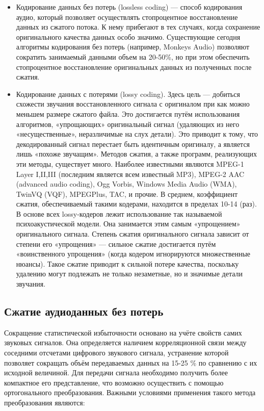 \documentclass[a4paper]{report}
\begin{document}
\begin{itemize}
\begin{itemize}
\item Кодирование данных без потерь (lossless coding) — способ кодирования аудио, который позволяет осуществлять стопроцентное восстановление данных из сжатого потока. К нему прибегают в тех случаях, когда сохранение оригинального качества данных особо значимо. Существующие сегодня алгоритмы кодирования без потерь (например, Monkeys Audio) позволяют сократить занимаемый данными объем на 20-50\%, но при этом обеспечить стопроцентное восстановление оригинальных данных из полученных после сжатия.
\item Кодирование данных с потерями (lossy coding). Здесь цель — добиться схожести звучания восстановленного сигнала с оригиналом при как можно меньшем размере сжатого файла. Это достигается путём использования алгоритмов, «упрощающих» оригинальный сигнал (удаляющих из него «несущественные», неразличимые на слух детали). Это приводит к тому, что декодированный сигнал перестает быть идентичным оригиналу, а является лишь «похоже звучащим». Методов сжатия, а также программ, реализующих эти методы, существует много. Наиболее известными являются MPEG-1 Layer I,II,III (последним является всем известный MP3), MPEG-2 AAC (advanced audio coding), Ogg Vorbis, Windows Media Audio (WMA), TwinVQ (VQF), MPEGPlus, TAC, и прочие. В среднем, коэффициент сжатия, обеспечиваемый такими кодерами, находится в пределах 10-14 (раз). В основе всех lossy-кодеров лежит использование так называемой психоакустической модели. Она занимается этим самым «упрощением» оригинального сигнала. Степень сжатия оригинального сигнала зависит от степени его «упрощения» — сильное сжатие достигается путём «воинственного упрощения» (когда кодером игнорируются множественные нюансы). Такое сжатие приводит к сильной потере качества, поскольку удалению могут подлежать не только незаметные, но и значимые детали звучания.
\end{itemize}
\end{itemize}

\subsection{Сжатие аудиоданных без потерь}
Сокращение статистической избыточности основано на учёте свойств самих звуковых сигналов. Она определяется наличием корреляционной связи между соседними отсчетами цифрового звукового сигнала, устранение которой позволяет сокращать объём передаваемых данных на 15-25 \% по сравнению с их исходной величиной. Для передачи сигнала необходимо получить более компактное его представление, что возможно осуществить с помощью ортогонального преобразования. Важными условиями применения такого метода преобразования являются:
\end{document}
